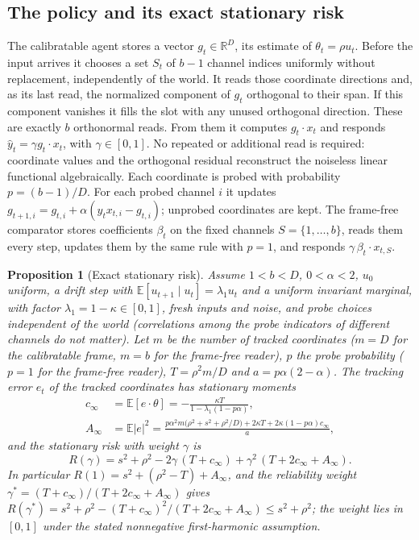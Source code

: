 \documentclass[12pt]{article}
\newtheorem{proposition}[theorem]{Proposition}
\theoremstyle{definition}
\newcommand{\E}{\mathbb E}
\newcommand{\R}{\mathbb R}
\begin{document}
\subsection{The policy and its exact stationary risk}

The calibratable agent stores a vector $g_t\in\R^D$, its estimate of $\theta_t=\rho u_t$. Before the input arrives it chooses a set $S_t$ of $b-1$ channel indices uniformly without replacement, independently of the world. It reads those coordinate directions and, as its last read, the normalized component of $g_t$ orthogonal to their span. If this component vanishes it fills the slot with any unused orthogonal direction. These are exactly $b$ orthonormal reads. From them it computes $g_t\cdot x_t$ and responds $\hat y_t=\gamma g_t\cdot x_t$, with $\gamma\in[0,1]$. No repeated or additional read is required: coordinate values and the orthogonal residual reconstruct the noiseless linear functional algebraically. Each coordinate is probed with probability $p=(b-1)/D$. For each probed channel $i$ it updates $g_{t+1,i}=g_{t,i}+\alpha(y_tx_{t,i}-g_{t,i})$; unprobed coordinates are kept. The frame-free comparator stores coefficients $\beta_t$ on the fixed channels $S=\{1,\dots,b\}$, reads them every step, updates them by the same rule with $p=1$, and responds $\gamma\,\beta_t\cdot x_{t,S}$.

\begin{proposition}[Exact stationary risk]
\label{prop:stationary}
Assume $1<b<D$, $0<\alpha<2$, $u_0$ uniform, a drift step with $\E[u_{t+1}\mid u_t]=\lambda_1u_t$ and a uniform invariant marginal, with factor $\lambda_1=1-\kappa\in[0,1]$, fresh inputs and noise, and probe choices independent of the world (correlations among the probe indicators of different channels do not matter). Let $m$ be the number of tracked coordinates ($m=D$ for the calibratable frame, $m=b$ for the frame-free reader), $p$ the probe probability ($p=1$ for the frame-free reader), $T=\rho^2m/D$ and $a=p\alpha(2-\alpha)$. The tracking error $e_t$ of the tracked coordinates has stationary moments
\begin{equation}
\label{eq:stationary}
\begin{aligned}
c_\infty&=\E[e\cdot\theta]=-\frac{\kappa T}{1-\lambda_1(1-p\alpha)},\\
A_\infty&=\E|e|^2=\frac{p\alpha^2m\bigl(\rho^2+s^2+\rho^2/D\bigr)+2\kappa T+2\kappa(1-p\alpha)c_\infty}{a},
\end{aligned}
\end{equation}
and the stationary risk with weight $\gamma$ is
\begin{equation}
\label{eq:risk_gamma}
R(\gamma)=s^2+\rho^2-2\gamma\,(T+c_\infty)+\gamma^2\,(T+2c_\infty+A_\infty).
\end{equation}
In particular $R(1)=s^2+(\rho^2-T)+A_\infty$, and the reliability weight $\gamma^*=(T+c_\infty)/(T+2c_\infty+A_\infty)$ gives $R(\gamma^*)=s^2+\rho^2-(T+c_\infty)^2/(T+2c_\infty+A_\infty)\le s^2+\rho^2$; the weight lies in $[0,1]$ under the stated nonnegative first-harmonic assumption.
\end{proposition}
\end{document}
